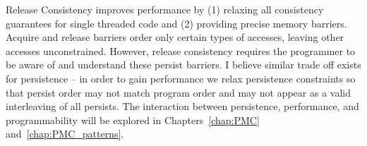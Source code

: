 Release Consistency improves performance by (1) relaxing all consistency guarantees for single threaded code and (2) providing precise memory barriers.
Acquire and release barriers order only certain types of accesses, leaving other accesses unconstrained.
However, release consistency requires the programmer to be aware of and understand these persist barriers.
I believe similar trade off exists for persistence -- in order to gain performance we relax persistence constraints so that persist order may not match program order and may not appear as a valid interleaving of all persists.
The interaction between persistence, performance, and programmability will be explored in Chapters~\ref{chap:PMC} and~\ref{chap:PMC_patterns}.

